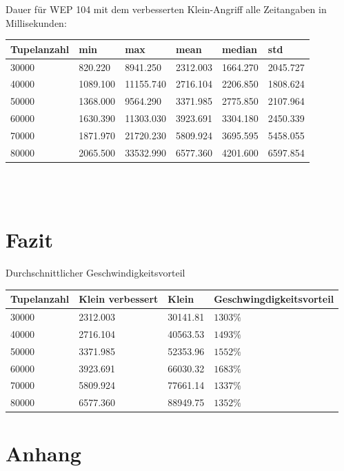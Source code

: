 \documentclass[10pt,a4paper]{article}
\begin{document}
Dauer für WEP 104 mit dem verbesserten Klein-Angriff alle Zeitangaben in Millisekunden:\\


\begin{tabular}{|l|l|l|l|l|l|}
	\hline
	Tupelanzahl & min      	& max 		& mean 		&   median 	&      std \\
	\hline
	30000 		& 820.220	& 8941.250 	& 2312.003  &	1664.270& 2045.727\\
	\hline
	40000 		& 1089.100 	& 11155.740 & 2716.104  & 	2206.850& 1808.624\\
	\hline
	50000		& 1368.000 	& 9564.290 	& 3371.985 	& 	2775.850& 2107.964\\ 
	\hline
	60000 		& 1630.390	& 11303.030 & 3923.691 	& 	3304.180& 2450.339\\ 
	\hline
	70000 		& 1871.970	& 21720.230	& 5809.924	&  	3695.595& 5458.055\\ 
	\hline
	80000 		& 2065.500 	& 33532.990	& 6577.360	&	4201.600& 6597.854\\
	\hline
	
\end{tabular}
\\\\


\section{Fazit}

Durchschnittlicher Geschwindigkeitsvorteil\\
\begin{tabular}{|l|l|l|l|}
	\hline
	Tupelanzahl & Klein verbessert   	& Klein  & Geschwingdigkeitsvorteil	 \\
			\hline
		30000& 2312.003& 30141.81 & $1303\%$\\
			\hline
		40000& 2716.104& 40563.53 & $1493\%$\\
			\hline
		50000& 3371.985& 52353.96 & $1552\%$\\
			\hline
		60000& 3923.691& 66030.32 & $1683\%$\\
			\hline
		70000& 5809.924& 77661.14 & $1337\%$\\
			\hline
		80000& 6577.360& 88949.75 & $1352\%$\\
	\hline
	
\end{tabular}



\section{Anhang}
\end{document}
